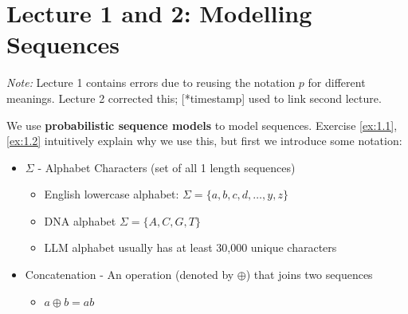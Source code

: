\documentclass[12pt, twoside]{article}
\begin{document}
\thispagestyle{RemoveHeader}

\section*{Lecture 1 and 2: Modelling Sequences}

\textit{Note:} Lecture 1 contains errors due to reusing the notation $p$ for different meanings. Lecture 2 corrected this; [*timestamp] used to link second lecture.


We use \textbf{probabilistic sequence models} to model sequences. Exercise \ref{ex:1.1}, \ref{ex:1.2} intuitively explain why we use this, but first we introduce some notation:

\begin{itemize}
    \item $\Sigma$ - Alphabet Characters (set of all 1 length sequences)
    \begin{itemize}
        \item English lowercase alphabet: $\Sigma=\{a, b, c, d, \dots, y, z\}$
        \item DNA alphabet $\Sigma = \{A,C,G,T\}$
        \item LLM alphabet usually has at least 30,000 unique characters
    \end{itemize}

     \item Concatenation - An operation (denoted by $\oplus$) that joins two sequences
     \begin{itemize}
        \item $a\oplus b=ab$
    \end{itemize}
\end{itemize}
\end{document}
